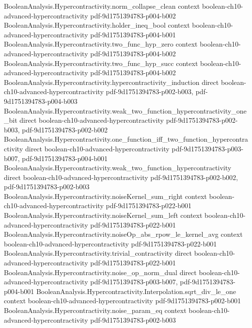 \begin{theorem}
\proofstep
  {BooleanAnalysis.Hypercontractivity.norm_collapse_clean}
  {context}
  {boolean-ch10-advanced-hypercontractivity}
  {pdf-9d1751394783-p004-b002}
\proofstep
  {BooleanAnalysis.Hypercontractivity.holder_ineq_bool}
  {context}
  {boolean-ch10-advanced-hypercontractivity}
  {pdf-9d1751394783-p004-b001}
\proofstep
  {BooleanAnalysis.Hypercontractivity.two_func_hyp_zero}
  {context}
  {boolean-ch10-advanced-hypercontractivity}
  {pdf-9d1751394783-p004-b002}
\proofstep
  {BooleanAnalysis.Hypercontractivity.two_func_hyp_succ}
  {context}
  {boolean-ch10-advanced-hypercontractivity}
  {pdf-9d1751394783-p004-b002}
\proofstep
  {BooleanAnalysis.Hypercontractivity.hypercontractivity_induction}
  {direct}
  {boolean-ch10-advanced-hypercontractivity}
  {pdf-9d1751394783-p002-b003,
    pdf-9d1751394783-p004-b003}
\proofstep
  {BooleanAnalysis.Hypercontractivity.weak_two_function_hypercontractivity_one_bit}
  {direct}
  {boolean-ch10-advanced-hypercontractivity}
  {pdf-9d1751394783-p002-b003,
    pdf-9d1751394783-p002-b002}
\proofstep
  {BooleanAnalysis.Hypercontractivity.one_function_iff_two_function_hypercontractivity}
  {direct}
  {boolean-ch10-advanced-hypercontractivity}
  {pdf-9d1751394783-p003-b007,
    pdf-9d1751394783-p004-b001}
\proofstep
  {BooleanAnalysis.Hypercontractivity.weak_two_function_hypercontractivity}
  {direct}
  {boolean-ch10-advanced-hypercontractivity}
  {pdf-9d1751394783-p002-b002,
    pdf-9d1751394783-p002-b003}
\proofstep
  {BooleanAnalysis.Hypercontractivity.noiseKernel_sum_right}
  {context}
  {boolean-ch10-advanced-hypercontractivity}
  {pdf-9d1751394783-p022-b001}
\proofstep
  {BooleanAnalysis.Hypercontractivity.noiseKernel_sum_left}
  {context}
  {boolean-ch10-advanced-hypercontractivity}
  {pdf-9d1751394783-p022-b001}
\proofstep
  {BooleanAnalysis.Hypercontractivity.noiseOp_abs_rpow_le_kernel_avg}
  {context}
  {boolean-ch10-advanced-hypercontractivity}
  {pdf-9d1751394783-p022-b001}
\proofstep
  {BooleanAnalysis.Hypercontractivity.trivial_contractivity}
  {direct}
  {boolean-ch10-advanced-hypercontractivity}
  {pdf-9d1751394783-p022-b001}
\proofstep
  {BooleanAnalysis.Hypercontractivity.noise_op_norm_dual}
  {direct}
  {boolean-ch10-advanced-hypercontractivity}
  {pdf-9d1751394783-p003-b007,
    pdf-9d1751394783-p004-b001}
\proofstep
  {BooleanAnalysis.Hypercontractivity.Interpolation.sqrt_div_le_one}
  {context}
  {boolean-ch10-advanced-hypercontractivity}
  {pdf-9d1751394783-p002-b001}
\proofstep
  {BooleanAnalysis.Hypercontractivity.noise_param_eq}
  {context}
  {boolean-ch10-advanced-hypercontractivity}
  {pdf-9d1751394783-p002-b003}

\end{theorem}

